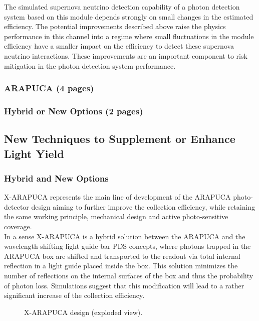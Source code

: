 The simulated supernova neutrino detection capability of a photon detection system 
based on this module depends strongly on small changes in the estimated efficiency.
 The potential improvements described above raise the physics performance in this 
channel into a regime where small fluctuations in the module efficiency have a 
smaller impact on the efficiency to detect these supernova neutrino interactions. 
These improvements are an important component to risk mitigation in the photon 
detection system performance.


\subsubsection{ARAPUCA (4 pages)}
\label{ssec:fdsp-pd-pc-arapuca}

\subsubsection{Hybrid or New Options (2 pages)}
\label{ssec:fdsp-pd-pc-new}

\subsection{New Techniques to Supplement or Enhance Light Yield}
\label{sec:fdsp-pd-enh}

\subsubsection{Hybrid and New Options}

X-ARAPUCA represents the main line of development of the ARAPUCA photo-detector design aiming to further improve the collection efficiency, while retaining the same working
 principle, mechanical design and active  photo-sensitive coverage.\\
In a sense X-ARAPUCA is a hybrid solution between the ARAPUCA and the wavelength-shifting light guide bar PDS concepts, 
where photons trapped in the ARAPUCA box are shifted and transported to the readout via total internal reflection in a light guide placed inside the box.
This solution minimizes the number of reflections on the internal surfaces of the box and thus the probability of photon loss. Simulations suggest that
 this modification will lead to a rather significant increase of the collection efficiency.
 \begin{figure}[htbp]
\begin{center}
 \vspace{-2.5cm}
\caption{X-ARAPUCA design (exploded view).}
\label{fig:exploded}
\end{center}
\end{figure}

